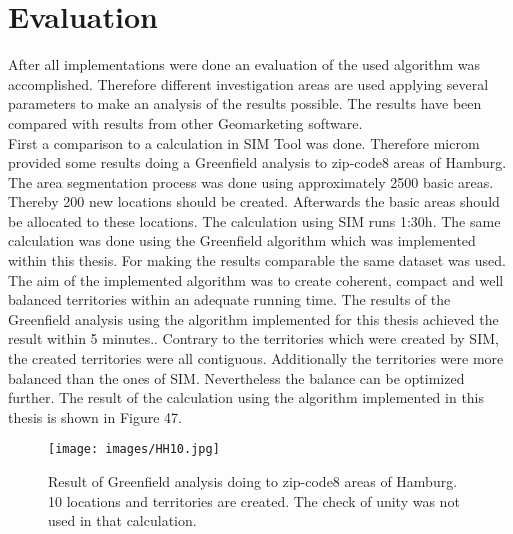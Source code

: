 \section{Evaluation}\label{evaluation}

After all implementations were done an evaluation of the used algorithm was accomplished. Therefore different investigation areas are used applying several parameters to make an analysis of the results possible. The results have been compared with results from other Geomarketing software. \\
First a comparison to a calculation in SIM Tool was done. Therefore microm provided some results doing a Greenfield analysis to zip-code8 areas of Hamburg. The area segmentation process was done using approximately 2500 basic areas. Thereby 200 new locations should be created. Afterwards the basic areas should be allocated to these locations. The calculation using SIM runs 1:30h. The same calculation was done using the Greenfield algorithm which was implemented within this thesis. For making the results comparable the same dataset was used. The aim of the implemented algorithm was to create coherent, compact and well balanced territories within an adequate running time. The results of the Greenfield analysis using the algorithm implemented for this thesis achieved the result within 5 minutes.. Contrary to the territories which were created by SIM, the created territories were all contiguous. Additionally the territories were more balanced than the ones of SIM. Nevertheless the balance can be optimized further. The result of the calculation using the algorithm implemented in this thesis is shown in Figure 47.

\begin{figure}[H]
	\centering
	\texttt{[image: images/HH10.jpg]}
	\caption[Result of Greenfield analysis doing to zip-code8 areas of Hamburg.]{Result of Greenfield analysis doing to zip-code8 areas of Hamburg. 10 locations and territories are created. The check of unity was not used in that calculation.}
\end{figure}


